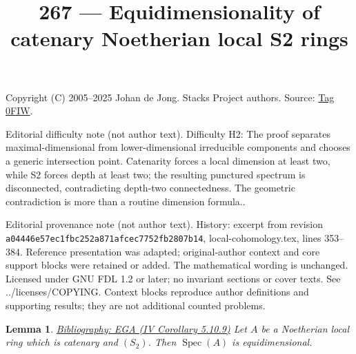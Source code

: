 \documentclass{amsart}
\newenvironment{reference}{\comment}{\endcomment}
\theoremstyle{plain}
\newtheorem{lemma}[subsection]{Lemma}
\theoremstyle{definition}
\theoremstyle{remark}
\numberwithin{equation}{subsection}
\def\Spec{\mathop{\mathrm{Spec}}}
\begin{document}
\title[Stacks Project, Tag 0FIW]{267 --- Equidimensionality of catenary Noetherian local S2 rings}
\maketitle
\noindent Copyright (C) 2005--2025 Johan de Jong. Stacks Project authors. Source: \href{https://stacks.math.columbia.edu/tag/0FIW}{Tag 0FIW}.

\noindent Editorial difficulty note (not author text). Difficulty H2: The proof separates maximal-dimensional from lower-dimensional irreducible components and chooses a generic intersection point. Catenarity forces a local dimension at least two, while S2 forces depth at least two; the resulting punctured spectrum is disconnected, contradicting depth-two connectedness. The geometric contradiction is more than a routine dimension formula..

\noindent Editorial provenance note (not author text). History: excerpt from revision \texttt{a0444\allowbreak 6e57e\allowbreak c1fbc\allowbreak 252a8\allowbreak 71afc\allowbreak ec775\allowbreak 2fb28\allowbreak 07b14}, local-cohomology.tex, lines 353--384. Reference presentation was adapted; original-author context and core support blocks were retained or added. The mathematical wording is unchanged. Licensed under GNU FDL 1.2 or later; no invariant sections or cover texts. See ../licenses/COPYING. Context blocks reproduce author definitions and supporting results; they are not additional counted problems.

\begin{lemma}
\label{lemma-catenary-S2-equidimensional}
\begin{reference}
\href{https://stacks.math.columbia.edu/bibliography}{Bibliography: EGA (IV Corollary 5.10.9)}
\end{reference}
Let $A$ be a Noetherian local ring which is catenary and $(S_2)$.
Then $\Spec(A)$ is equidimensional.
\end{lemma}
\end{document}
